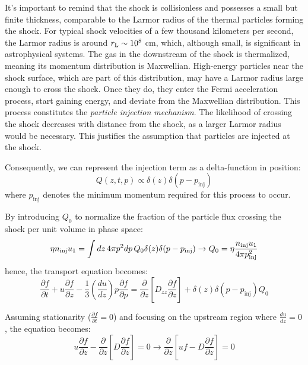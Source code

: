 It's important to remind that the shock is collisionless and possesses a small but finite thickness, comparable to the Larmor radius of the thermal particles forming the shock. For typical shock velocities of a few thousand kilometers per second, the Larmor radius is around \( r_{\rm L} \sim 10^8 \) cm, which, although small, is significant in astrophysical systems.
%
The gas in the downstream of the shock is thermalized, meaning its momentum distribution is Maxwellian. High-energy particles near the shock surface, which are part of this distribution, may have a Larmor radius large enough to cross the shock. Once they do, they enter the Fermi acceleration process, start gaining energy, and deviate from the Maxwellian distribution. This process constitutes the \emph{particle injection mechanism}. The likelihood of crossing the shock decreases with distance from the shock, as a larger Larmor radius would be necessary. This justifies the assumption that particles are injected at the shock.

Consequently, we can represent the injection term as a delta-function in position:
%
\begin{equation}
Q(z, t, p) \propto \delta(z) \delta(p - p_{\text{inj}})
\end{equation}
%
where \( p_{\text{inj}} \) denotes the minimum momentum required for this process to occur.

By introducing \( Q_0 \) to normalize the fraction of the particle flux crossing the shock per unit volume in phase space:
%
\begin{equation}
\eta n_{\rm inj} u_1 = \int dz \, 4 \pi p^2 dp \, Q_0 \delta(z) \delta(p - p_{\text{inj}}) \rightarrow Q_0 = \eta \frac{n_{\rm inj} u_1}{4 \pi p^2_{\rm inj}}
\end{equation}
%
hence, the transport equation becomes:
%
\begin{equation}
\frac{\partial f}{\partial t} + u\frac{\partial f}{\partial z} - \frac{1}{3}\left(\frac{du}{dz}\right)p\frac{\partial f}{\partial p} = \frac{\partial}{\partial z}\left[D_{zz} \frac{\partial f}{\partial z}\right] + \delta(z) \delta(p-p_{\text{inj}})Q_0
\end{equation}

Assuming stationarity (\( \frac{\partial f}{\partial t} = 0 \)) and focusing on the upstream region where \( \frac{du}{dz} = 0 \), the equation becomes:
%
\begin{equation}
u \frac{\partial f}{\partial z} - \frac{\partial}{\partial z} \left[D \frac{\partial f}{\partial z}\right] = 0 \rightarrow \frac{\partial}{\partial z}\left[uf - D \frac{\partial f}{\partial z}\right] = 0
\end{equation}

